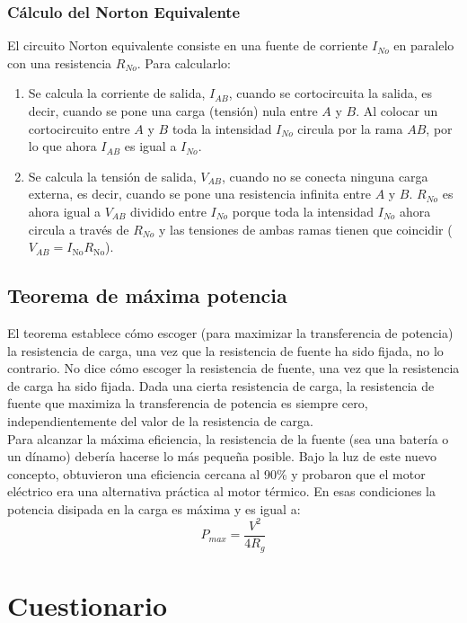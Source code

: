 \documentclass[a4paper,11pt]{report}
\begin{document}
\subsection{Cálculo del Norton Equivalente}
El circuito Norton equivalente consiste en una fuente de corriente $I_{No}$ en paralelo con una resistencia $R_{No}$. Para calcularlo:
\begin{enumerate}
\item Se calcula la corriente de salida, $I_{AB}$, cuando se cortocircuita la salida, es decir, cuando se pone una carga (tensión) nula entre $A$ y $B$. Al colocar un cortocircuito entre $A$ y $B$ toda la intensidad $I_{No}$ circula por la rama $AB$, por lo que ahora $I_{AB}$ es igual a $I_{No}$.
\item Se calcula la tensión de salida, $V_{AB}$, cuando no se conecta ninguna carga externa, es decir, cuando se pone una resistencia infinita entre $A$ y $B$. $R_{No}$ es ahora igual a $V_{AB}$ dividido entre $I_{No}$ porque toda la intensidad $I_{No}$ ahora circula a través de $R_{No}$ y las tensiones de ambas ramas tienen que coincidir ( $V_{AB} = I_{\mathrm{No}}R_{\mathrm{No}}$).
\end{enumerate}
\section{Teorema de máxima potencia}
El teorema establece cómo escoger (para maximizar la transferencia de potencia) la resistencia de carga, una vez que la resistencia de fuente ha sido fijada, no lo contrario. No dice cómo escoger la resistencia de fuente, una vez que la resistencia de carga ha sido fijada. Dada una cierta resistencia de carga, la resistencia de fuente que maximiza la transferencia de potencia es siempre cero, independientemente del valor de la resistencia de carga.\\
Para alcanzar la máxima eficiencia, la resistencia de la fuente (sea una batería o un dínamo) debería hacerse lo más pequeña posible. Bajo la luz de este nuevo concepto, obtuvieron una eficiencia cercana al 90\% y probaron que el motor eléctrico era una alternativa práctica al motor térmico. En esas condiciones la potencia disipada en la carga es máxima y es igual a: 
$$
P_{max} = \frac{V^{2}}{4R_{g}}
$$
\chapter{Cuestionario}
\end{document}
